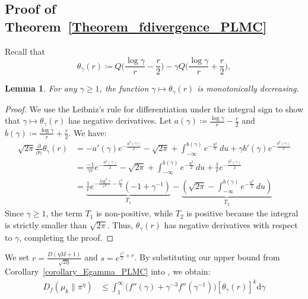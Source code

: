 \documentclass[10pt, journal]{IEEEtran}
\makeatletter
\def\eqref#1{equation~\ref{#1}}
\renewcommand{\eqref}[1]{\textup{\tagform@{\ref{#1}}}}
\newtheorem{lemma}{Lemma}
\makeatother
\begin{document}
\subsection{Proof of Theorem~\ref{Theorem_fdivergence_PLMC}}
\label{Appendix_fdivergence_PLMC}
Recall that 
\begin{equation}\label{def:thetaGamma}
    \theta_\gamma(r)\coloneqq Q\Big(\frac{\log\gamma}{r}-\frac r2\Big)-\gamma Q\Big(\frac{\log\gamma}{r}+\frac r2\Big),
\end{equation}
\begin{lemma}
\label{monotonetheta}
    For any $\gamma \ge 1$, the function $\gamma \mapsto \theta_\gamma(r)$ is monotonically decreasing.
\end{lemma}
\begin{proof}
    We use the Leibniz's rule for differentiation under the integral sign to show that $\gamma \mapsto \theta_\gamma(r)$ has negative derivatives. Let $a(\gamma) \coloneqq \frac{\log\gamma}{r} - \frac{r}{2}$ and $b(\gamma) \coloneqq \frac{\log\gamma}{r} + \frac{r}{2}$. We have:
    \begin{align}
       \sqrt{2\pi}\frac{\partial}{\partial \gamma}\theta_\gamma(r) 
        &= -a'(\gamma)e^{-\frac{a^2(\gamma)}{2}}  -\sqrt{2\pi} + \int_{-\infty}^{b(\gamma)} \!\!\!e^{-\frac{u^2}{2}} \,du +\gamma b'(\gamma) e^{-\frac{b^2(\gamma)}{2}} \nonumber\\
        &= \frac{-1}{\gamma r} e^{-\frac{a^2(\gamma)}{2}} - \sqrt{2\pi} + \int_{-\infty}^{b(\gamma)}\!\!\! e^{-\frac{u^2}{2}} \,du + \frac{1}{r} e^{-\frac{b^2(\gamma)}{2}} \nonumber\\
        &= \underbrace{\frac{1}{r} e^{-\frac{\log^2 \gamma}{r^2} - \frac{r^2}{4}} \left( -1 + \gamma^{-1} \right)}_{T_1} - \underbrace{\left(\sqrt{2\pi} - \int_{-\infty}^{b(\gamma)}\!\!\! e^{-\frac{u^2}{2}} \,du \right)}_{T_2}\nonumber
    \end{align}
   Since $\gamma \geq 1$, the term $T_1$ is non-positive, while $T_2$ is positive because the integral is strictly smaller than $\sqrt{2\pi}$. Thus, \( \theta_\gamma(r) \) has negative derivatives with respect to $\gamma$, completing the proof.
\end{proof}

We set $r = \frac{D(\eta M + 1)}{\sqrt{2\eta}}$ and $s = e^{\frac{{r^2}}{2}+r}$. By substituting our upper bound from Corollary~\ref{corollary_Egamma_PLMC} into \eqref{f_representation}, we obtain:
\begin{align}
    D_{f}(\mu_{k} \| \pi^\eta) &\le \int_1^\infty \Big(f''(\gamma) + \gamma^{-3}f''(\gamma^{-1})\Big)\left[\theta_{\gamma}\left(r\right)\right]^{k} \mathrm{d}\!\gamma\nonumber
\end{align}
\end{document}
